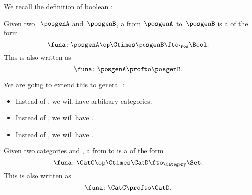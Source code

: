 We recall the definition of boolean :

\begin{ctdefinition}
    \label{def:boolean-profunctor-again}
    Given two ~$\posgenA$ and~$\posgenB$, a  from~$\posgenA$ to~$\posgenB$ is a  of the form
    \begin{equation}
        \label{eq:boolean-profunctor-funa}
        \funa\colon \posgenA\op \Ctimes \posgenB \fto_{\Pos} \Bool.
    \end{equation}
    This is also written as
    \begin{equation}
        \funa\colon \posgenA \profto \posgenB.
    \end{equation}
\end{ctdefinition}

We are going to extend this to general :
\begin{itemize}
    \item Instead of , we will have arbitrary categories.
    \item Instead of \Bool, we will have \Set.
    \item Instead of  , we will have .
\end{itemize}

\begin{ctdefinition}[Profunctors]
    \label{def:profunctor}
    Given two categories \CatC and \CatD, a  from \CatC to \CatD is a  of the form
    \begin{equation}
        \label{eq:profunctors-def-1}
        \funa\colon \CatC\op \Ctimes \CatD \fto_{\Category} \Set.
    \end{equation}
    This is also written as
    \begin{equation}
        \label{eq:profunctors-def-2}
        \funa\colon \CatC \profto \CatD.
    \end{equation}
\end{ctdefinition}

